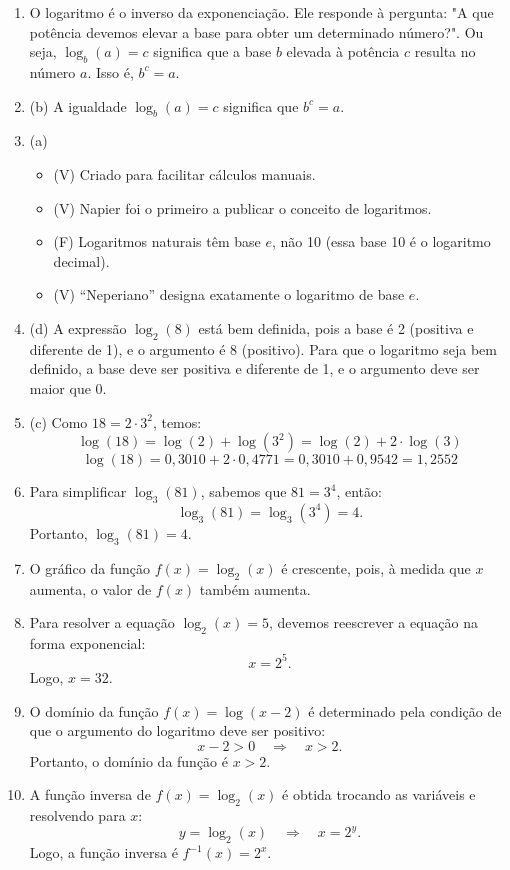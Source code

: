 \documentclass[12pt,a4paper]{article}
\begin{document}
\begin{enumerate}
  \item O logaritmo é o inverso da exponenciação. Ele responde à pergunta: "A que potência devemos elevar a
        base para obter um determinado número?". Ou seja, $\log_b(a) = c$ significa que a base $b$ elevada
        à potência $c$ resulta no número $a$. Isso é, $b^c = a$.

  \item (b) A igualdade $\log_b(a) = c$ significa que $b^c = a$.

  \item (a)
        \begin{itemize}
          \item (V) Criado para facilitar cálculos manuais.
          \item (V) Napier foi o primeiro a publicar o conceito de logaritmos.
          \item (F) Logaritmos naturais têm base \(e\), não 10 (essa base 10 é o logaritmo decimal).
          \item (V) “Neperiano” designa exatamente o logaritmo de base \(e\).
        \end{itemize}


  \item (d) A expressão $\log_2(8)$ está bem definida, pois a base é 2 (positiva e diferente de 1),
        e o argumento é 8 (positivo).
        Para que o logaritmo seja bem definido, a base deve ser positiva e diferente de 1,
        e o argumento deve ser maior que 0.

  \item (c) Como $18 = 2 \cdot 3^2$, temos:
        \[
          \log(18) = \log(2) + \log(3^2) = \log(2) + 2 \cdot \log(3)
        \]
        \[
          \log(18) = 0{,}3010 + 2 \cdot 0{,}4771 = 0{,}3010 + 0{,}9542 = 1{,}2552
        \]

  \item Para simplificar $\log_3(81)$, sabemos que $81 = 3^4$, então:
        \[
          \log_3(81) = \log_3(3^4) = 4.
        \]
        Portanto, $\log_3(81) = 4$.

  \item O gráfico da função $f(x) = \log_2(x)$ é crescente, pois, à medida que $x$ aumenta,
        o valor de $f(x)$ também aumenta.

  \item Para resolver a equação $\log_2(x) = 5$, devemos reescrever a equação na forma exponencial:
        \[
          x = 2^5.
        \]
        Logo, $x = 32$.

  \item O domínio da função $f(x) = \log(x - 2)$ é determinado pela condição de que o argumento do
        logaritmo deve ser positivo:
        \[
          x - 2 > 0 \quad \Rightarrow \quad x > 2.
        \]
        Portanto, o domínio da função é $x > 2$.

  \item A função inversa de $f(x) = \log_2(x)$ é obtida trocando as variáveis e resolvendo para $x$:
        \[
          y = \log_2(x) \quad \Rightarrow \quad x = 2^y.
        \]
        Logo, a função inversa é $f^{-1}(x) = 2^x$.
\end{enumerate}
\end{document}
